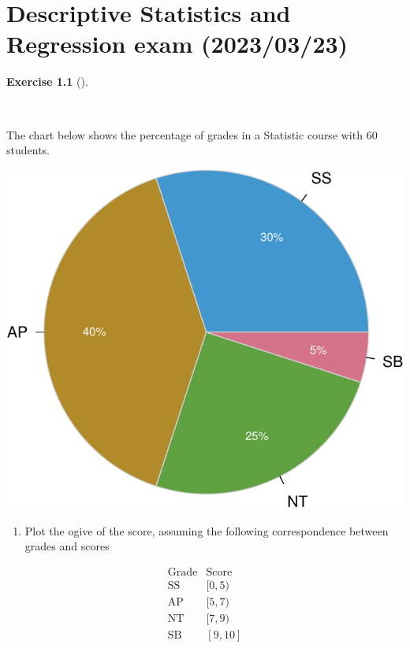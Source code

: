 \documentclass[
  a4paper,
]{scrreport}
\providecommand{\tightlist}{%
  \setlength{\itemsep}{0pt}\setlength{\parskip}{0pt}}\usepackage{longtable,booktabs,array}
\theoremstyle{definition}
\newtheorem{exercise}{Exercise}[chapter]
\theoremstyle{remark}
\begin{document}

\hypertarget{descriptive-statistics-and-regression-exam-20230323}{%
\chapter{Descriptive Statistics and Regression exam
(2023/03/23)}\label{descriptive-statistics-and-regression-exam-20230323}}

\begin{exercise}[]\protect\hypertarget{exr-1}{}\label{exr-1}

~

The chart below shows the percentage of grades in a Statistic course
with 60 students.

\includegraphics{img/exam-2023-03-23/pie-chart-scores-1.pdf}

\begin{enumerate}
\def\labelenumi{\alph{enumi}.}
\tightlist
\item
  Plot the ogive of the score, assuming the following correspondence
  between grades and scores
\end{enumerate}

\[
\begin{array}{lc}
  \mbox{Grade} & \mbox{Score}\\
  \mbox{SS} & [0, 5)\\
  \mbox{AP} & [5, 7)\\
  \mbox{NT} & [7,9)\\
  \mbox{SB} & [9,10]
\end{array}
\]


\end{exercise}
\end{document}
